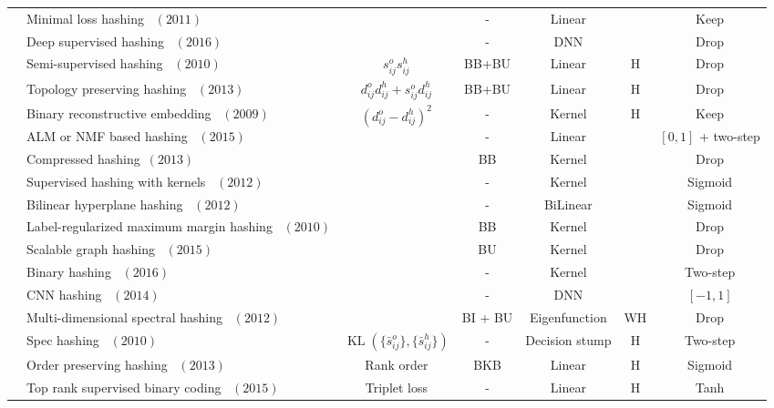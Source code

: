 \documentclass[10pt,journal,compsoc]{IEEEtran}
\begin{document}
\begin{table}[t]
\begin{tabular}{|@{~}c@{~}|@{~}l@{~}||@{~}c@{~}|@{~}c@{~}|@{~}c@{~}||@{~}c@{~}||@{~}c@{~}|}
& Minimal loss hashing~\cite{NorouziF11} $(2011)$ &
  & -   & Linear & & Keep \\
  &Deep supervised hashing~\cite{Liu0SC16} $(2016)$&
    & -   & DNN & & Drop \\
\cline{2-7}
& Semi-supervised hashing~\cite{WangKC10a,WangKC10b,WangKC12} $(2010)$&
$s_{ij}^os_{ij}^h$ & BB+BU & Linear & H  & Drop\\
\cline{2-7}
& Topology preserving hashing~\cite{ZhangZTGLT13} $(2013)$ &
$d_{ij}^od_{ij}^h + s_{ij}^od_{ij}^h$ & BB+BU    & Linear & H & Drop\\
\cline{2-7}
& Binary reconstructive embedding~\cite{KulisD09} $(2009)$ &
\multirow{3}{*}{$(d_{ij}^o-d_{ij}^h)^2$} & {-}  & Kernel & \multirow{3}{*}{H} & Keep \\
& {ALM or NMF based hashing~\cite{MukherjeeRIHS15} $(2015)$ } &
 &-   & Linear &  & $[0,1]$ + two-step\\
 & Compressed hashing~\cite{LinJCYL13}$(2013)$ &
  & BB   & Kernel & & Drop \\
\cline{2-7}
& Supervised hashing with kernels~\cite{LiuWJJC12} $(2012)$ &
{\multirow{7}{*}{\rotatebox[origin=c]{0}{$(s_{ij}^o-s_{ij}^h)^2$}}}  & -   & Kernel & {\multirow{7}{*}{\rotatebox[origin=c]{0}{H}}} & Sigmoid\\
& Bilinear hyperplane hashing~\cite{LiuWMKC12} $(2012)$&
 & -  & BiLinear & & Sigmoid  \\
& Label-regularized maximum margin hashing~\cite{MuSY10} $(2010)$ &
& BB  & Kernel && Drop \\
& {Scalable graph hashing~\cite{JiangL15} $(2015)$ }&
& BU   & Kernel & & Drop\\
& Binary hashing~\cite{DoDNC16} $(2016)$ &
& -   & Kernel & & Two-step\\
& {CNN hashing~\cite{XiaPLLY14} $(2014)$ }&
& -   &  {DNN} & & $[-1,1]$\\
& Multi-dimensional spectral hashing~\cite{WeissFT12} $(2012)$& & BI + BU & Eigenfunction & WH & Drop \\
\cline{2-7}
& Spec hashing~\cite{LinRY10} $(2010)$&
$\operatorname{KL}(\{\bar{s}_{ij}^o\}, \{\bar{s}_{ij}^h\})$ & -  & Decision stump & H  & Two-step\\
 \hline
 \hline
 {\multirow{5}{*}{\rotatebox[origin=c]{0}{Multiwise}}} &
 Order preserving hashing~\cite{WangWYL13} $(2013)$ & Rank order &  BKB   & Linear  & H & Sigmoid\\
  \cline{2-7}
 &
   {Top rank supervised binary coding~\cite{SongLJMS15} $(2015)$}& \multirow{5}{*}{Triplet loss} &  -   & Linear  & \multirow{5}{*}{H} & Tanh\\

\end{tabular}
\end{table}
\end{document}
